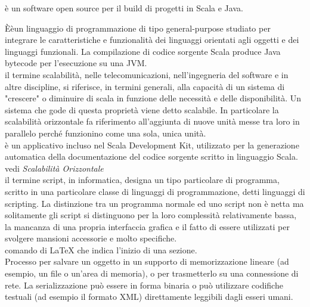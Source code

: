 \documentclass{scalatekids-article}
\begin{document}

   è un software open source per il build di progetti in Scala e Java.

   Èèun linguaggio di programmazione di tipo general-purpose studiato per integrare le caratteristiche e funzionalità dei linguaggi orientati agli oggetti e dei linguaggi funzionali. La compilazione di codice sorgente Scala produce Java bytecode per l'esecuzione su una JVM.
  \\

   il termine scalabilità, nelle telecomunicazioni, nell'ingegneria del software e in altre discipline, si riferisce, in termini generali, alla capacità di un sistema di "crescere" o diminuire di scala in funzione delle necessità e delle disponibilità. Un sistema che gode di questa proprietà viene detto scalabile.
  In particolare la scalabilità orizzontale fa riferimento all’aggiunta di nuove unità messe tra loro in parallelo perché funzionino come una sola, unica unità.
  \\

   è un applicativo incluso nel Scala Development Kit, utilizzato per la generazione automatica della documentazione del codice sorgente scritto in linguaggio Scala.
  \\

   vedi \textit{Scalabilità Orizzontale}
  \\

   il termine script, in informatica, designa un tipo particolare di programma, scritto in una particolare classe di linguaggi di programmazione, detti linguaggi di scripting.
  La distinzione tra un programma normale ed uno script non è netta ma solitamente gli script si distinguono per la loro complessità relativamente bassa, la mancanza di una propria interfaccia grafica e il fatto di essere utilizzati per svolgere mansioni accessorie e molto specifiche.
  \\

   comando di \LaTeX\xspace che indica l'inizio di una sezione.
  \\
  
   Processo per salvare un oggetto in un supporto di memorizzazione lineare (ad esempio, un file o un'area di memoria), o per trasmetterlo su una connessione di rete. La serializzazione può essere in forma binaria o può utilizzare codifiche testuali (ad esempio il formato XML) direttamente leggibili dagli esseri umani.
  \\
\end{document}
